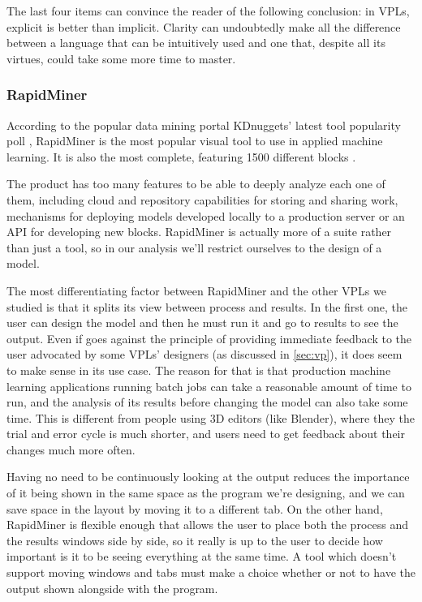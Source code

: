 The last four items can convince the reader of the following conclusion: in VPLs, explicit
is better than implicit. Clarity can undoubtedly make all the
difference between a language that can be intuitively used and one that, despite
all its virtues, could take some more time to master.

\subsubsection{RapidMiner}

According to the popular data mining portal KDnuggets' latest tool popularity
poll \cite{kdn}, RapidMiner is the most popular visual tool to use in applied
machine learning. It is also the most complete, featuring 1500 different blocks \cite{rapidminer}.

The product has too many features to be able to deeply analyze each one of them,
including cloud and repository capabilities for storing and sharing work,
mechanisms for deploying models developed locally to a production server or
an API for developing new blocks. RapidMiner is actually more of a suite rather
than just a tool, so in our analysis we'll restrict ourselves to the design of
a model.

The most differentiating factor between RapidMiner and the other VPLs we studied
is that it splits its view between process and results. In the first one, the
user can design the model and then he must run it and go to results to see the output.
Even if goes against the principle of providing immediate feedback to the user
advocated by some VPLs' designers (as discussed in \ref{sec:vp}), it does seem to make
sense in its use case. The reason for that is that production machine learning applications
running batch jobs can take a reasonable amount of time to run, and the analysis
of its results before changing the model can also take some time. This is
different from people using 3D editors (like Blender), where they the trial and
error cycle is much shorter, and users need to get feedback about their changes
much more often.

Having no need to be continuously looking at the output reduces the importance
of it being shown in the same space as the program we're designing, and we can
save space in the layout by moving it to a different tab. On the other hand,
RapidMiner is flexible enough that allows the user to place both the process
and the results windows side by side, so it really is up to the user to decide
how important is it to be seeing everything at the same time. A tool which doesn't
support moving windows and tabs must make a choice whether or not to have the
output shown alongside with the program.


